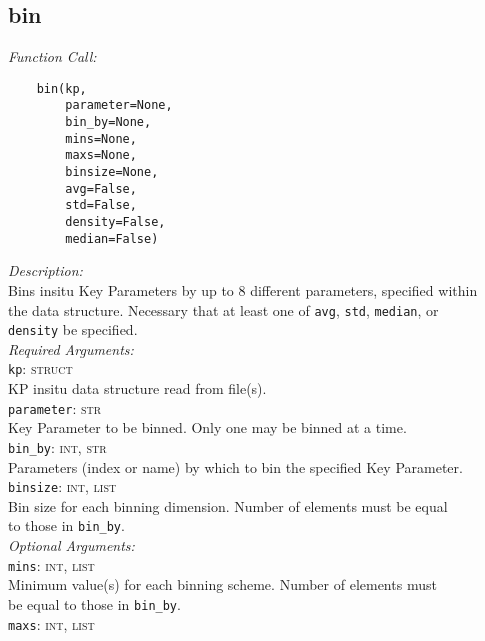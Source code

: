 \documentclass{article}
\begin{document}
\subsection{bin}
\label{subsec:bin}
\vspace{-5mm}
\textit{Function Call:}\\
\vspace{-10mm}
\begin{verbatim}
    bin(kp,
        parameter=None,
        bin_by=None,
        mins=None,
        maxs=None,
        binsize=None,
        avg=False,
        std=False,
        density=False,
        median=False)
\end{verbatim}
\vspace{-5mm}
\noindent
\textit{Description:}\\
\indent Bins insitu Key Parameters by up to 8 different parameters, specified within\\
\indent the data structure. Necessary that at least one of \texttt{avg}, \texttt{std}, \texttt{median}, or\\
\indent \texttt{density} be specified.\\
\textit{Required Arguments:}\\
\indent \texttt{kp}: \textsc{struct}\\
\indent \indent KP insitu data structure read from file(s).\\ 
\indent \texttt{parameter}: \textsc{str}\\
\indent \indent Key Parameter to be binned. Only one may be binned at a time.\\
\indent \texttt{bin\_by}: \textsc{int, str}\\
\indent \indent Parameters (index or name) by which to bin the specified Key Parameter.\\
\indent \texttt{binsize}: \textsc{int, list}\\
\indent \indent Bin size for each binning dimension. Number of elements must be equal \\
\indent \indent to those in \texttt{bin\_by}.\\
\textit{Optional Arguments:}\\
\indent \texttt{mins}: \textsc{int, list}\\
\indent \indent Minimum value(s) for each binning scheme. Number of elements must\\
\indent \indent be equal to those in \texttt{bin\_by}.\\
\indent \texttt{maxs}: \textsc{int, list}\\
\end{document}
